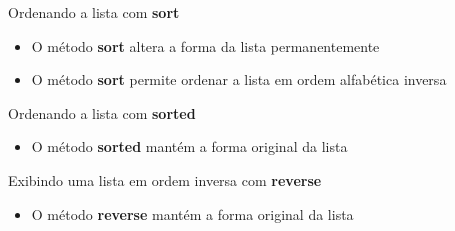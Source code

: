 %
\begin{frame}[t, fragile]{Ordenando a lista com {\bf sort}}
  \begin{itemize}
    \item O método {\bf sort} altera a forma da lista permanentemente 
    
    \item O método {\bf sort} permite ordenar a lista em ordem alfabética inversa
    
  \end{itemize}  
\end{frame}
%
\begin{frame}[t, fragile]{Ordenando a lista com {\bf sorted}}
  \begin{itemize}
    \item O método {\bf sorted} mantém a forma original da lista
    
  \end{itemize}  
\end{frame}
%
\begin{frame}[t, fragile]{Exibindo uma lista em ordem inversa com {\bf reverse}}
  \begin{itemize}
    \item O método {\bf reverse} mantém a forma original da lista
    
  \end{itemize}  
\end{frame}
%






 